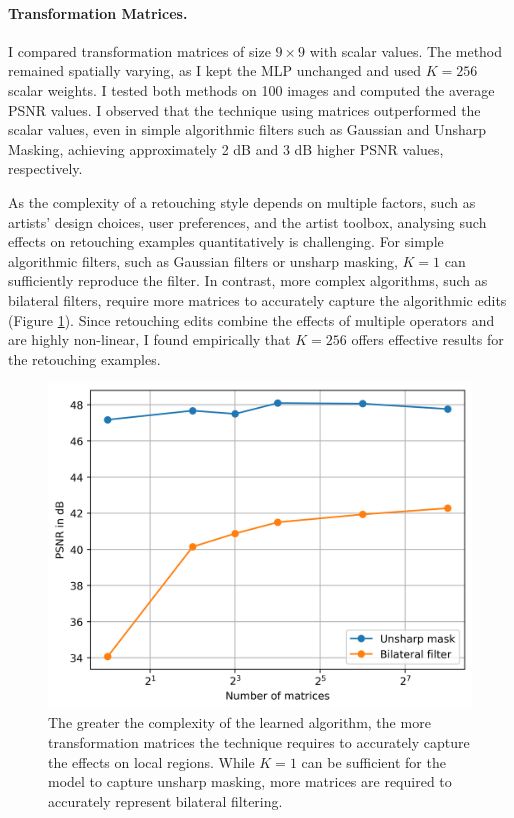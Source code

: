 \paragraph{Transformation Matrices.} I compared transformation matrices of size $9 \times 9$ with scalar values. The method remained spatially varying, as I kept the \gls{MLP} unchanged and used $K=256$ scalar weights. I tested both methods on 100 images and computed the average \gls{PSNR} values. I observed that the technique using matrices outperformed the scalar values, even in simple algorithmic filters such as Gaussian and Unsharp Masking, achieving approximately 2 dB and 3 dB higher \gls{PSNR} values, respectively.

As the complexity of a retouching style depends on multiple factors, such as artists’ design choices, user preferences, and the artist toolbox, analysing such effects on retouching examples quantitatively is challenging. For simple algorithmic filters, such as Gaussian filters or unsharp masking, $K=1$ can sufficiently reproduce the filter. In contrast, more complex algorithms, such as bilateral filters, require more matrices to accurately capture the algorithmic edits (Figure \ref{fig:ablation_K}). Since retouching edits combine the effects of multiple operators and are highly non-linear, I found empirically that $K=256$ offers effective results for the retouching examples.


\begin{figure}[th] %
    \centering
	\includegraphics[width=0.6\columnwidth]{Chapters/detail-retouching-figs/ablation_matrices.png}

    \caption{The greater the complexity of the learned algorithm, the more transformation matrices the technique requires to accurately capture the effects on local regions. While $K=1$ can be sufficient for the model to capture unsharp masking, more matrices are required to accurately represent bilateral filtering.}

    \label{fig:ablation_K}
\end{figure}

